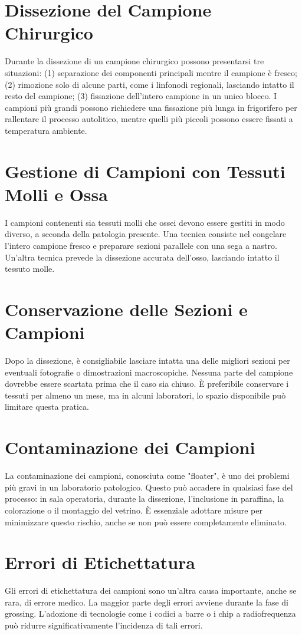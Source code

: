 \section{Dissezione del Campione Chirurgico}
Durante la dissezione di un campione chirurgico possono presentarsi tre situazioni: (1) separazione dei componenti principali mentre il campione è fresco; (2) rimozione solo di alcune parti, come i linfonodi regionali, lasciando intatto il resto del campione; (3) fissazione dell'intero campione in un unico blocco. I campioni più grandi possono richiedere una fissazione più lunga in frigorifero per rallentare il processo autolitico, mentre quelli più piccoli possono essere fissati a temperatura ambiente.

\section{Gestione di Campioni con Tessuti Molli e Ossa}
I campioni contenenti sia tessuti molli che ossei devono essere gestiti in modo diverso, a seconda della patologia presente. Una tecnica consiste nel congelare l'intero campione fresco e preparare sezioni parallele con una sega a nastro. Un'altra tecnica prevede la dissezione accurata dell'osso, lasciando intatto il tessuto molle.

\section{Conservazione delle Sezioni e Campioni}
Dopo la dissezione, è consigliabile lasciare intatta una delle migliori sezioni per eventuali fotografie o dimostrazioni macroscopiche. Nessuna parte del campione dovrebbe essere scartata prima che il caso sia chiuso. È preferibile conservare i tessuti per almeno un mese, ma in alcuni laboratori, lo spazio disponibile può limitare questa pratica.

\section{Contaminazione dei Campioni}
La contaminazione dei campioni, conosciuta come "floater", è uno dei problemi più gravi in un laboratorio patologico. Questo può accadere in qualsiasi fase del processo: in sala operatoria, durante la dissezione, l'inclusione in paraffina, la colorazione o il montaggio del vetrino. È essenziale adottare misure per minimizzare questo rischio, anche se non può essere completamente eliminato.

\section{Errori di Etichettatura}
Gli errori di etichettatura dei campioni sono un'altra causa importante, anche se rara, di errore medico. La maggior parte degli errori avviene durante la fase di grossing. L'adozione di tecnologie come i codici a barre o i chip a radiofrequenza può ridurre significativamente l'incidenza di tali errori.
